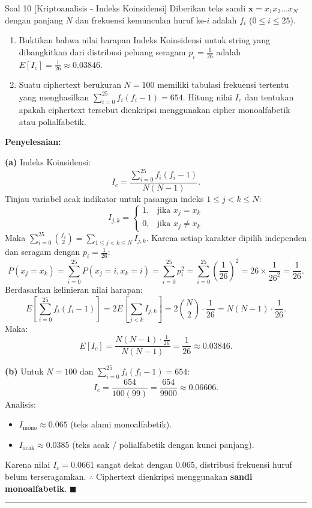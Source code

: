 \documentclass[11pt,a4paper]{article}
\newenvironment{solusi}{\noindent\textbf{\textsf{Penyelesaian:}}\par\vspace{0.2em}}{\hfill$\blacksquare$\vspace{1em}\par\hrule\vspace{1em}}
\begin{document}
\begin{soalanalisis}{Soal 10 [Kriptoanalisis - Indeks Koinsidensi]}
Diberikan teks sandi $\mathbf{x} = x_1 x_2 \dots x_N$ dengan panjang $N$ dan frekuensi kemunculan huruf ke-$i$ adalah $f_i$ ($0 \le i \le 25$).
\begin{enumerate}[label=(\alph*)]
    \item Buktikan bahwa nilai harapan Indeks Koinsidensi untuk string yang dibangkitkan dari distribusi peluang seragam $p_i = \frac{1}{26}$ adalah $E[I_c] = \frac{1}{26} \approx 0.03846$.
    \item Suatu ciphertext berukuran $N = 100$ memiliki tabulasi frekuensi tertentu yang menghasilkan $\sum_{i=0}^{25} f_i(f_i - 1) = 654$. Hitung nilai $I_c$ dan tentukan apakah ciphertext tersebut dienkripsi menggunakan cipher monoalfabetik atau polialfabetik.
\end{enumerate}
\end{soalanalisis}

\begin{solusi}
\textbf{(a)} Indeks Koinsidensi:
\[
I_c = \frac{\sum_{i=0}^{25} f_i(f_i - 1)}{N(N - 1)}.
\]
Tinjau variabel acak indikator untuk pasangan indeks $1 \le j < k \le N$:
\[
I_{j, k} = \begin{cases} 1, & \text{jika } x_j = x_k \\ 0, & \text{jika } x_j \ne x_k \end{cases}
\]
Maka $\sum_{i=0}^{25} \binom{f_i}{2} = \sum_{1 \le j < k \le N} I_{j, k}$. Karena setiap karakter dipilih independen dan seragam dengan $p_i = \frac{1}{26}$:
\[
P(x_j = x_k) = \sum_{i=0}^{25} P(x_j = i, x_k = i) = \sum_{i=0}^{25} p_i^2 = \sum_{i=0}^{25} \left(\frac{1}{26}\right)^2 = 26 \times \frac{1}{26^2} = \frac{1}{26}.
\]
Berdasarkan kelinieran nilai harapan:
\[
E\left[\sum_{i=0}^{25} f_i(f_i - 1)\right] = 2 E\left[\sum_{j < k} I_{j, k}\right] = 2 \binom{N}{2} \cdot \frac{1}{26} = N(N - 1) \cdot \frac{1}{26}.
\]
Maka:
\[
E[I_c] = \frac{N(N - 1) \cdot \frac{1}{26}}{N(N - 1)} = \frac{1}{26} \approx 0.03846.
\]

\textbf{(b)} Untuk $N = 100$ dan $\sum_{i=0}^{25} f_i(f_i - 1) = 654$:
\[
I_c = \frac{654}{100(99)} = \frac{654}{9900} \approx 0.06606.
\]
Analisis:
\begin{itemize}
    \item $I_{\text{mono}} \approx 0.065$ (teks alami monoalfabetik).
    \item $I_{\text{acak}} \approx 0.0385$ (teks acak / polialfabetik dengan kunci panjang).
\end{itemize}
Karena nilai $I_c = 0.0661$ sangat dekat dengan $0.065$, distribusi frekuensi huruf belum terseragamkan.
$\therefore$ Ciphertext dienkripsi menggunakan \textbf{sandi monoalfabetik}.
\end{solusi}
\end{document}
